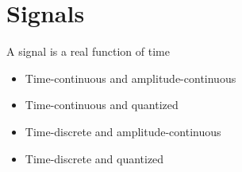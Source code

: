 \section{Signals}

\begin{definition}[Signal]
   A signal is a real function of time
\end{definition}
\begin{itemize}
   \item Time-continuous and amplitude-continuous
   \item Time-continuous and quantized
   \item Time-discrete and amplitude-continuous
   \item Time-discrete and quantized
\end{itemize}


